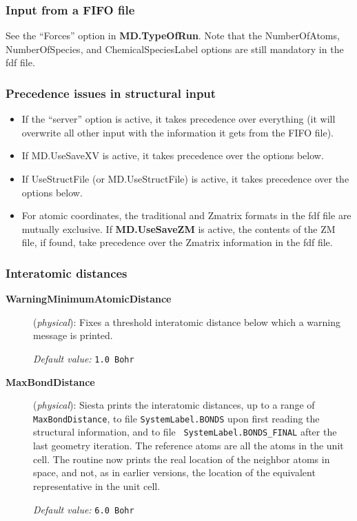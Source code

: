 \documentclass[11pt]{article}
\begin{document}
\subsubsection{Input from a FIFO file}

See the ``Forces'' option in {\bf MD.TypeOfRun}.
Note that the NumberOfAtoms, NumberOfSpecies, and ChemicalSpeciesLabel
options are still mandatory in the fdf file.

\subsubsection{Precedence issues in structural input}

\begin{itemize}
\item If the ``server'' option is active, it takes precedence over
everything (it will overwrite all other input with the information it
gets from the FIFO file).

\item If MD.UseSaveXV is active, it takes precedence over the options below.

\item If UseStructFile (or MD.UseStructFile) is active, it takes precedence
over the options below.

\item For atomic coordinates, the traditional and Zmatrix formats in
  the fdf file are mutually exclusive. If {\bf MD.UseSaveZM} is
  active, the contents of the ZM file, if found, take precedence over
  the Zmatrix information in the fdf file.

\end{itemize}

\subsubsection{Interatomic distances}

\begin{description}
\item[{\bf WarningMinimumAtomicDistance}] ({\it physical}):
Fixes a threshold interatomic distance below which a warning
message is printed.

{\it Default value:} {\tt 1.0 Bohr}

\item[{\bf MaxBondDistance}] ({\it physical}):
 {\sc Siesta} prints the
interatomic distances, up to a range of
{\tt MaxBondDistance}, to file {\tt SystemLabel.BONDS} upon first
reading the structural information, and to file {\tt
SystemLabel.BONDS\_FINAL} after the last geometry iteration. The
reference atoms are all the atoms in the unit cell. The routine now
prints the real location of the neighbor atoms in space, and not, as in
earlier versions, the location of the equivalent representative in the
unit cell.

{\it Default value:} {\tt 6.0 Bohr}

\end{description}
\end{document}
